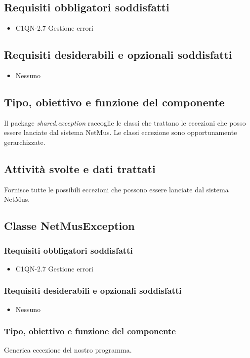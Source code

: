 \subsection*{Requisiti obbligatori soddisfatti}
\begin{itemize}
	\item C1QN-2.7 Gestione errori
\end{itemize}
\subsection*{Requisiti desiderabili e opzionali soddisfatti}
\begin{itemize}
    \item Nessuno
\end{itemize}
\subsection*{Tipo, obiettivo e funzione del componente}
Il package \emph{shared.exception} raccoglie le classi che trattano
le eccezioni che posso essere lanciate dal sistema NetMus. Le classi eccezione
sono opportunamente gerarchizzate.
\subsection*{Attivit\`a svolte e dati trattati}
Fornisce tutte le possibili eccezioni che possono essere lanciate dal sistema
NetMus.

\subsection{Classe NetMusException}
\subsubsection*{Requisiti obbligatori soddisfatti}
\begin{itemize}
	\item C1QN-2.7 Gestione errori
\end{itemize}
\subsubsection*{Requisiti desiderabili e opzionali soddisfatti}
\begin{itemize}
    \item Nessuno
\end{itemize}
\subsubsection*{Tipo, obiettivo e funzione del componente}
Generica eccezione del nostro programma.
